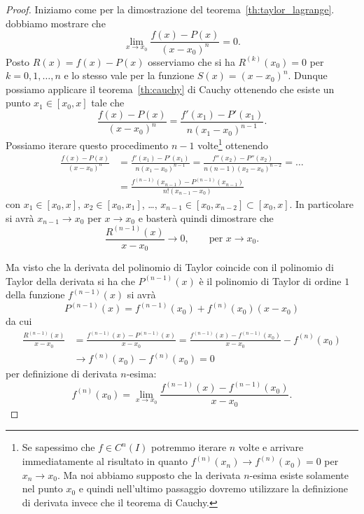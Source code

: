 \begin{proof}
\mymark{**}
Iniziamo come per la dimostrazione del teorema~\ref{th:taylor_lagrange}.
dobbiamo
mostrare che
\[
  \lim_{x\to x_0} \frac{f(x)- P(x)}{(x-x_0)^n} = 0.
\]
Posto $R(x) = f(x)-P(x)$
osserviamo che si ha $R^{(k)}(x_0) =  0$ per $k=0,1, \dots, n$
e lo stesso vale per la funzione $S(x) = (x-x_0)^n$.
Dunque possiamo applicare il teorema~\ref{th:cauchy} di Cauchy ottenendo
che esiste un punto $x_1\in[x_0,x]$ tale che
\[
  \frac{f(x)-P(x)}{(x-x_0)^n} = \frac{f'(x_1)-P'(x_1)}{n(x_1-x_0)^{n-1}}.
\]
Possiamo iterare questo procedimento $n-1$ volte\footnote{%
Se sapessimo che $f\in C^n(I)$ potremmo iterare $n$ volte e arrivare immediatamente al risultato
in quanto $f^{(n)}(x_n)\to f^{(n)}(x_0) = 0$ per $x_n\to x_0$.
Ma noi abbiamo supposto che la derivata $n$-esima esiste solamente nel punto $x_0$
e quindi nell'ultimo passaggio dovremo utilizzare la definizione di derivata invece
che il teorema di Cauchy.}
ottenendo
\begin{align*}
  \frac{f(x) - P(x)}{(x-x_0)^n}
  &= \frac{f'(x_1)-P'(x_1)}{n(x_1-x_0)^{n-1}}
  = \frac{f''(x_2)-P''(x_2)}{n(n-1)(x_2-x_0)^{n-2}}
  = \dots \\
  &= \frac{f^{(n-1)}(x_{n-1}) - P^{(n-1)}(x_{n-1})}{n!(x_{n-1}-x_0)}
\end{align*}
con $x_1 \in [x_0,x]$, $x_2\in [x_0,x_1]$, \dots, $x_{n-1} \in [x_0,x_{n-2}]\subset[x_0,x]$.
In particolare si avrà $x_{n-1}\to x_0$ per $x\to x_0$ e basterà
quindi dimostrare che
\[
\frac{R^{(n-1)}(x)}{x-x_0} \to 0, \qquad \text{per $x\to x_0$}.
\]

Ma visto che la derivata del polinomio di Taylor coincide con il
polinomio di Taylor della derivata si ha che $P^{(n-1)}(x)$
è il polinomio di Taylor di ordine $1$ della funzione $f^{(n-1)}(x)$
si avrà
\[
  P^{(n-1)} (x) = f^{(n-1)}(x_0) + f^{(n)}(x_0) (x-x_0)
\]
da cui
\begin{align*}
\frac{R^{(n-1)}(x)}{x-x_0}
&= \frac{f^{(n-1)}(x) - P^{(n-1)}(x)}{x-x_0}
= \frac{f^{(n-1)}(x) - f^{(n-1)}(x_0)}{x-x_0} - f^{(n)}(x_0)\\
&\to f^{(n)}(x_0) - f^{(n)}(x_0)
 = 0
\end{align*}
per definizione di derivata $n$-esima:
\[
  f^{(n)}(x_0) = \lim_{x\to x_0} \frac{f^{(n-1)}(x)-f^{(n-1)}(x_0)}{x-x_0}.
\]


\end{proof}
